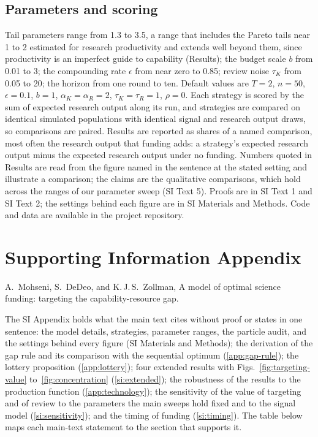 \documentclass[9pt,twocolumn,twoside]{pnas-new}
\begin{document}
{\subsection*{Parameters and scoring} Tail parameters range from 1.3 to 3.5, a range that includes the Pareto tails near 1 to 2 estimated for research productivity \citep{Lotka1926, Nicholls1989} and extends well beyond them, since productivity is an imperfect guide to capability (Results); the budget scale $b$ from 0.01 to 3; the compounding rate $\epsilon$ from near zero to 0.85; review noise $\tau_K$ from 0.05 to 20; the horizon from one round to ten. Default values are $T = 2$, $n = 50$, $\epsilon = 0.1$, $b = 1$, $\alpha_K = \alpha_R = 2$, $\tau_K = \tau_R = 1$, $\rho = 0$. Each strategy is scored by the sum of expected research output along its run, and strategies are compared on identical simulated populations with identical signal and research output draws, so comparisons are paired. Results are reported as shares of a named comparison, most often the research output that funding adds: a strategy's expected research output minus the expected research output under no funding. Numbers quoted in Results are read from the figure named in the sentence at the stated setting and illustrate a comparison; the claims are the qualitative comparisons, which hold across the ranges of our parameter sweep (SI Text 5). Proofs are in SI Text 1 and SI Text 2; the settings behind each figure are in SI Materials and Methods. Code and data are available in the project repository. }
\showmatmethods{}
\showacknow{}

\clearpage\onecolumn
{}
\section*{Supporting Information Appendix}
\noindent A.~Mohseni, S.~DeDeo, and K.\,J.\,S.~Zollman, A model of optimal science funding: targeting the capability-resource gap.

\setcounter{section}{0}
\setcounter{figure}{0}
\setcounter{table}{0}
\setcounter{prop}{1} %

The SI Appendix holds what the main text cites without proof or states in one sentence: the model details, strategies, parameter ranges, the particle audit, and the settings behind every figure (SI Materials and Methods); the derivation of the gap rule and its comparison with the sequential optimum (\ref{app:gap-rule}); the lottery proposition (\ref{app:lottery}); four extended results with Figs.~\ref{fig:targeting-value} to~\ref{fig:concentration} (\ref{si:extended}); the robustness of the results to the production function (\ref{app:technology}); the sensitivity of the value of targeting and of review to the parameters the main sweeps hold fixed and to the signal model (\ref{si:sensitivity}); and the timing of funding (\ref{si:timing}). The table below maps each main-text statement to the section that supports it.
\end{document}
